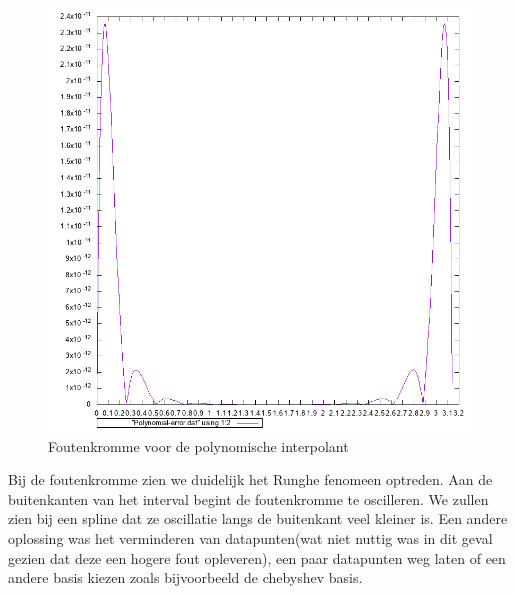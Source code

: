\documentclass[10pt,a4paper]{article}
\begin{document}
\begin{figure}[H]
\centering
\includegraphics[scale= 0.5]{../Onegraphs/Polynomial-Error.png}
\caption{Foutenkromme voor de polynomische interpolant}
\end{figure}
Bij de foutenkromme zien we duidelijk het Runghe fenomeen optreden. Aan de buitenkanten van het interval begint de foutenkromme te oscilleren. We zullen zien bij een spline dat ze oscillatie langs de buitenkant veel kleiner is. Een andere oplossing was het verminderen van datapunten(wat niet nuttig was in dit geval gezien dat deze een hogere fout opleveren), een paar datapunten weg laten of een andere basis kiezen zoals bijvoorbeeld de chebyshev basis.
\end{document}
